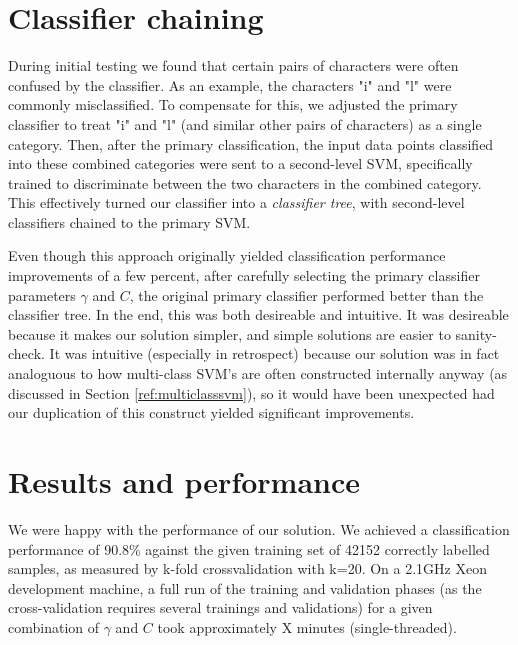 \documentclass{netsec2012}
\begin{document}
\section{Classifier chaining}

During initial testing we found that certain pairs of characters were often confused by the
classifier.  As an example, the characters "i" and "l" were commonly misclassified.  To compensate
for this, we adjusted the primary classifier to treat "i" and "l" (and similar other pairs of
characters) as a single category.  Then, after the primary classification, the input data points
classified into these combined categories were sent to a second-level SVM, specifically trained to
discriminate between the two characters in the combined category.  This effectively turned our
classifier into a \emph{classifier tree}, with second-level classifiers chained to the primary SVM.

Even though this approach originally yielded classification performance improvements of a few
percent, after carefully selecting the primary classifier parameters $\gamma$ and $C$, the original
primary classifier performed better than the classifier tree.  In the end, this was both desireable
and intuitive.  It was desireable because it makes our solution simpler, and simple solutions are
easier to sanity-check.  It was intuitive (especially in retrospect) because our solution was in
fact analoguous to how multi-class SVM's are often constructed internally anyway (as discussed in
Section \ref{ref:multiclasssvm}), so it would have been unexpected had our duplication of this
construct yielded significant improvements.


\section{Results and performance}

We were happy with the performance of our solution.  We achieved a classification performance of
90.8\% against the given training set of 42152 correctly labelled samples, as measured by k-fold
crossvalidation with k=20.  On a 2.1GHz Xeon development machine, a full run of the training and
validation phases (as the cross-validation requires several trainings and validations) for a given
combination of $\gamma$ and $C$ took approximately X minutes (single-threaded).
\end{document}
